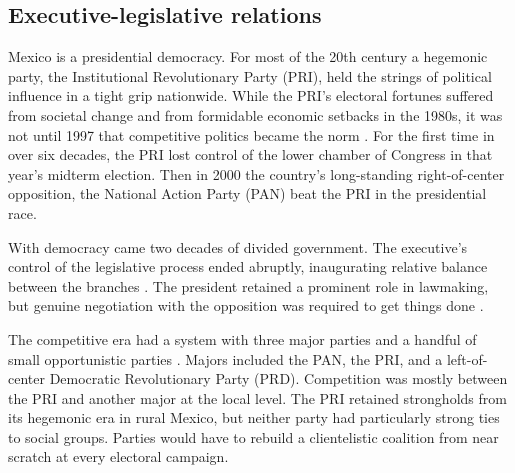 \documentclass[letter,12pt]{article}
\begin{document}

\subsection{Executive-legislative relations}

Mexico is a presidential democracy. For most of the 20th century a hegemonic party, the Institutional Revolutionary Party (PRI), held the strings of political influence in a tight grip nationwide. While the PRI's electoral fortunes suffered from societal change and from formidable economic setbacks in the 1980s, it was not until 1997 that competitive politics became the norm \citep{scott.1959,cosio.villegas.1981,molinar.1991a,cornelius.1996}. For the first time in over six decades, the PRI lost control of the lower chamber of Congress in that year's midterm election. Then in 2000 the country's long-standing right-of-center opposition, the National Action Party (PAN) beat the PRI in the presidential race.  

With democracy came two decades of divided government. The executive's control of the legislative process ended abruptly, inaugurating relative balance between the branches \citep{weldon.1997,lujambio.segl.2000}. The president retained a prominent role in lawmaking, but genuine negotiation with the opposition was required to get things done \citep{casarSinMay2013,bejarQuienLegisla2012}. 

The competitive era had a system with three major parties and a handful of small opportunistic parties \citep[see][]{moreno.decisElec.2009,magar.altman.mcd.trelles2016pg,diaz-estevez-magaloni-Poverty-book.2016}. Majors included the PAN, the PRI, and a left-of-center Democratic Revolutionary Party (PRD). Competition was mostly between the PRI and another major at the local level. The PRI retained strongholds from its hegemonic era in rural Mexico, but neither party had particularly strong ties to social groups. Parties would have to rebuild a clientelistic coalition from near scratch at every electoral campaign.
\end{document}

